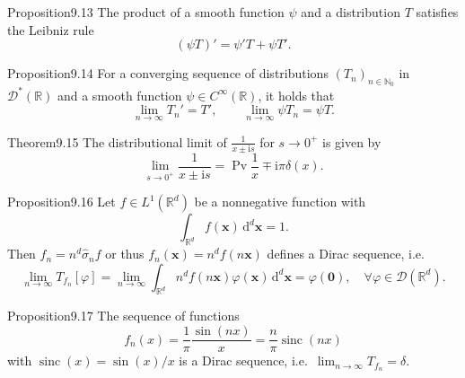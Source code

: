 \begin{res}{Proposition}{9.13}
The product of a smooth function $\psi$ and a distribution $T$ satisfies the Leibniz rule
\begin{equation}(\psi T)'=\psi'T+\psi T'.\tag{9.56}\end{equation}
\end{res}

\begin{res}{Proposition}{9.14}
For a converging sequence of distributions $(T_n)_{n\in\mathbb N_0}$ in $\mathcal D^*(\mathbb R)$ and a smooth function $\psi\in C^\infty(\mathbb R)$, it holds that
\begin{equation}\lim_{n\to\infty}T_n'=T',\qquad\lim_{n\to\infty}\psi T_n=\psi T.\tag{9.73}\end{equation}
\end{res}

\begin{res}{Theorem}{9.15}
The distributional limit of $\frac1{x\pm\mathrm is}$ for $s\to0^+$ is given by
\begin{equation}\lim_{s\to0^+}\frac1{x\pm\mathrm is}=\operatorname{Pv}\frac1x\mp\mathrm i\pi\delta(x).\tag{9.74}\end{equation}
\end{res}

\begin{res}{Proposition}{9.16}
Let $f\in L^1(\mathbb R^d)$ be a nonnegative function with
\begin{equation}\int_{\mathbb R^d}f(\boldsymbol x)\,\mathrm d^d\boldsymbol x=1.\tag{9.78}\end{equation}
Then $f_n=n^d\hat\sigma_nf$ or thus $f_n(\boldsymbol x)=n^df(n\boldsymbol x)$ defines a Dirac sequence, i.e.
\begin{equation}\lim_{n\to\infty}T_{f_n}[\varphi]=\lim_{n\to\infty}\int_{\mathbb R^d}n^df(n\boldsymbol x)\varphi(\boldsymbol x)\,\mathrm d^d\boldsymbol x=\varphi(\boldsymbol 0),\quad\forall\varphi\in\mathcal D(\mathbb R^d).\tag{9.79}\end{equation}
\end{res}

\begin{res}{Proposition}{9.17}
The sequence of functions
\begin{equation}f_n(x)=\frac1\pi\frac{\sin(nx)}{x}=\frac n\pi\operatorname{sinc}(nx)\tag{9.89}\end{equation}
with $\operatorname{sinc}(x)=\sin(x)/x$ is a Dirac sequence, i.e.\ $\lim_{n\to\infty}T_{f_n}=\delta$.
\end{res}

